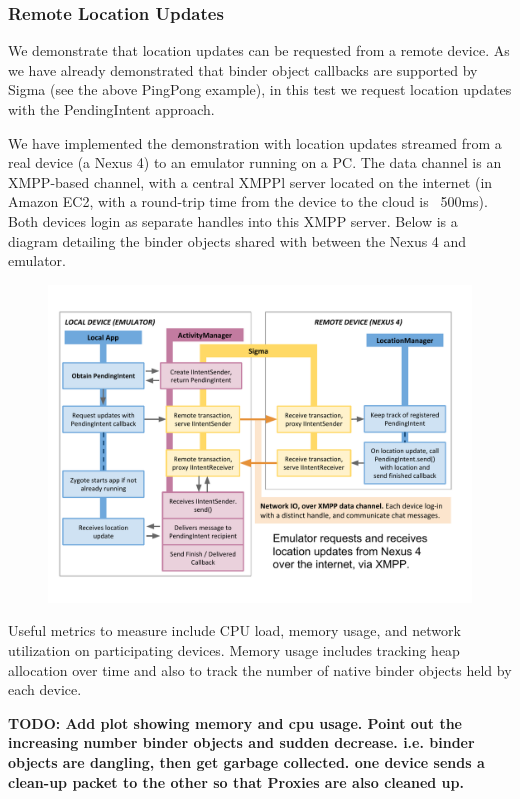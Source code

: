 \documentclass[prodmode]{acmlarge}
\begin{document}
\subsubsection{Remote Location Updates}
We demonstrate that location updates can be requested from a remote device. As we have already demonstrated that binder object callbacks are supported by Sigma (see the above PingPong example), in this test we request location updates with the PendingIntent approach.

We have implemented the demonstration with location updates streamed from a real device (a Nexus 4) to an emulator running on a PC. The data channel is an XMPP-based channel, with a central XMPPl server located on the internet (in Amazon EC2, with a round-trip time from the device to the cloud is ~500ms). Both devices login as separate handles into this XMPP server.
Below is a diagram detailing the binder objects shared with between the Nexus 4 and emulator.

\begin{figure}[h]
\centering
\includegraphics[width=\textwidth]{drawings/LocationPendingIntentExample.pdf}
\end{figure}

Useful metrics to measure include CPU load, memory usage, and network utilization on participating devices. Memory usage includes tracking heap allocation over time and also to track the number of native binder objects held by each device.

\textbf{TODO: Add plot showing memory and cpu usage. Point out the increasing number binder objects and sudden decrease. i.e. binder objects are dangling, then get garbage collected. one device sends a clean-up packet to the other so that Proxies are also cleaned up.}
\end{document}
